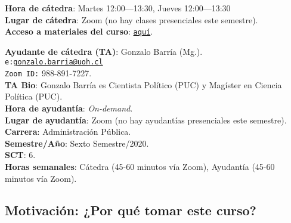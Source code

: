 \documentclass[letterpaper]{article}
\begin{document}
\vspace{5mm}
{\bf Hora de c\'atedra}: Martes 12:00---13:30, Jueves 12:00---13:30\\
{\bf Lugar de c\'atedra}: Zoom (no hay clases presenciales este semestre).\\

{\bf Acceso a materiales del curso}: \href{https://ucampus.uoh.cl/uoh/2020/2/AP2107/1/}{\texttt{aqu\'i}}.

\vspace{5mm}
{\bf Ayudante de c\'atedra (TA)}: Gonzalo Barr\'ia (Mg.).\\
\texttt{e:}\href{mailto:gonzalo.barria@uoh.cl}{\texttt{gonzalo.barria@uoh.cl}}\\
\texttt{Zoom ID:} 988-891-7227.\\
{\bf TA Bio}: Gonzalo Barr\'ia es Cientista Pol\'itico (PUC) y Mag\'ister en Ciencia Pol\'itica (PUC).\\
{\bf Hora de ayudant\'ia}: \emph{On-demand}.\\
{\bf Lugar de ayudant\'ia}: Zoom (no hay ayudant\'ias presenciales este semestre).\\


\vspace{5mm}
{\bf Carrera}:  Administraci\'on P\'ublica.\\
{\bf Semestre/A\~no}: Sexto Semestre/2020.\\
{\bf SCT}: 6.\\
{\bf Horas semanales}: C\'atedra (45-60 minutos v\'ia Zoom), Ayudant\'ia  (45-60 minutos v\'ia Zoom). \\




\subsection*{Motivaci\'on: ¿Por qu\'e tomar este curso?}
\end{document}
